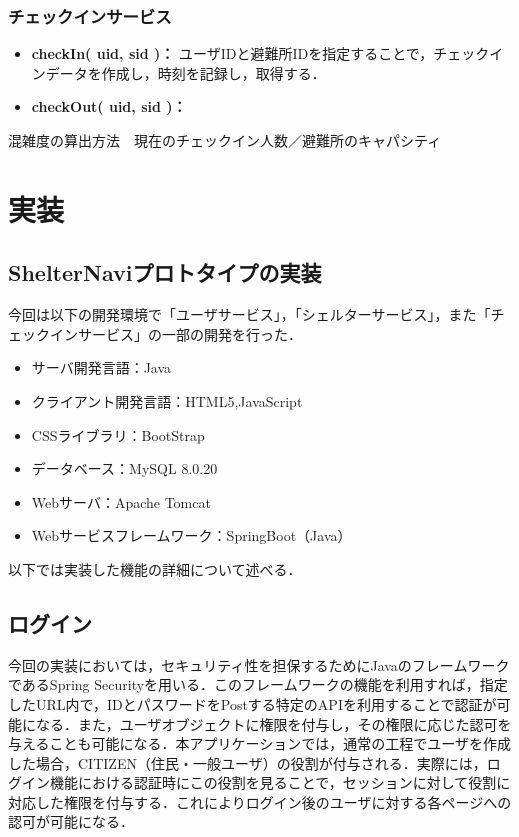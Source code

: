 \documentclass[technicalreport]{ieicej}
\begin{document}

\subsubsection{チェックインサービス}
\begin{itemize}
    \item{\textbf{checkIn( uid, sid )：}
         ユーザIDと避難所IDを指定することで，チェックインデータを作成し，時刻を記録し，取得する．}
    \item{\textbf{checkOut( uid, sid )：}
    }
\end{itemize}
混雑度の算出方法　現在のチェックイン人数／避難所のキャパシティ

\section{実装}
\subsection{ShelterNaviプロトタイプの実装}
今回は以下の開発環境で「ユーザサービス」，「シェルターサービス」，また「チェックインサービス」の一部の開発を行った．
\begin{itemize}
    \item サーバ開発言語：Java
    \item クライアント開発言語：HTML5,JavaScript
    \item CSSライブラリ：BootStrap
    \item データベース：MySQL 8.0.20
    \item Webサーバ：Apache Tomcat
    \item Webサービスフレームワーク：SpringBoot（Java）
\end{itemize}
以下では実装した機能の詳細について述べる．

\subsection{ログイン}
今回の実装においては，セキュリティ性を担保するためにJavaのフレームワークであるSpring Securityを用いる．このフレームワークの機能を利用すれば，指定したURL内で，IDとパスワードをPostする特定のAPIを利用することで認証が可能になる．また，ユーザオブジェクトに権限を付与し，その権限に応じた認可を与えることも可能になる．本アプリケーションでは，通常の工程でユーザを作成した場合，CITIZEN（住民・一般ユーザ）の役割が付与される．実際には，ログイン機能における認証時にこの役割を見ることで，セッションに対して役割に対応した権限を付与する．これによりログイン後のユーザに対する各ページへの認可が可能になる．
\end{document}

